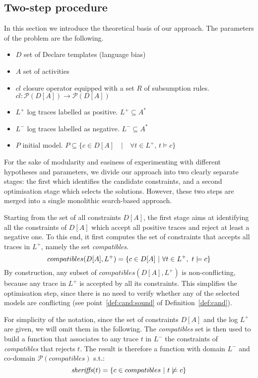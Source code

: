 \subsection{Two-step procedure}

In this section we introduce the theoretical basis of our \nd approach. The parameters of the problem are the following.
\begin{itemize}
  \item $D$ set of Declare templates (language bias)
  \item $A$ set of activities
  \item $cl$ closure operator equipped with a set $R$ of subsumption rules. $cl: \mathcal{P}(D[A])\rightarrow\mathcal{P}(D[A])$
  \item $L^+$ log traces labelled as positive. $L^+ \subseteq A^*$
  \item $L^-$ log traces labelled as negative. $L^- \subseteq A^*$
  \item $P$ initial model. $P\subseteq \{c\in D[A]\quad | \quad \forall t\in L^+,\, t\models c\}$
\end{itemize}

For the sake of modularity and easiness of experimenting with different hypotheses and parameters, we divide our approach into two clearly separate stages: the first which identifies the candidate constraints, and a second optimisation stage which selects the solutions. However, these two steps are merged into a single monolithic search-based approach. 

Starting from the set of all constraints $D[A]$, the first stage aims at identifying all the constraints of $D[A]$ which accept all positive traces and reject at least a negative one. To this end, it first computes the set of constraints that accepts all traces in $L^+$, namely the set \emph{compatibles}. 
\begin{equation}
{compatibles(D[A], L^+)} = \{c\in D[A]~|~\forall t\in L^+,~ t\models c \} \\
\end{equation}
%
By construction, any subset of ${compatibles(D[A], L^+)}$ is non-conflicting, because any trace in ${L^+}$ is accepted by all its constraints. This simplifies the optimisation step, since there is no need to verify whether any of the selected models are conflicting (see point~\ref{def:cand:sound} of Definition~\ref{def:cand}).

For simplicity of the notation, since the set of constraints $D[A]$ and the log $L^+$ are given, we will omit them in the following.
%
The \emph{compatibles} set is then used to build a \textit{\sheriff} function that associates to any trace $t$ in $L^-$ the constraints of \textit{compatibles} that rejects $t$. 
The result is therefore a function with domain $L^-$ and co-domain $\mathcal{P}({compatibles})$ s.t.:
\begin{equation}
{\textit{sheriffs}}(t) = \{c\in {compatibles}~|~t\not\models c\} \\
\end{equation}



